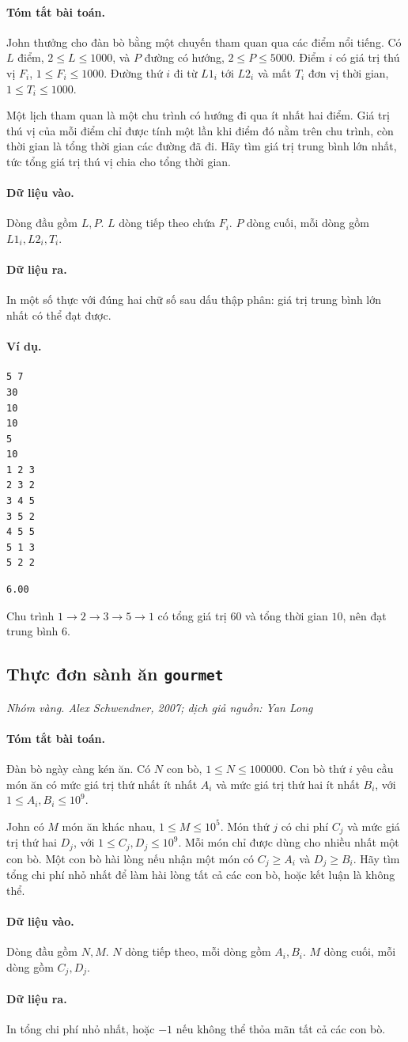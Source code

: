 \documentclass[11pt]{article}
\newcommand{\problem}[4]{%
  \subsection[#1 (#2)]{#1 \hfill {\normalsize\texttt{#2}}}%
  \noindent\textit{#3. #4}\par\smallskip
}
\newcommand{\iosec}[1]{\paragraph{#1}}
\begin{document}
\iosec{Tóm tắt bài toán.}
John thưởng cho đàn bò bằng một chuyến tham quan qua các điểm nổi tiếng. Có
\(L\) điểm, \(2\le L\le 1000\), và \(P\) đường có hướng,
\(2\le P\le 5000\). Điểm \(i\) có giá trị thú vị \(F_i\),
\(1\le F_i\le 1000\). Đường thứ \(i\) đi từ \(L1_i\) tới \(L2_i\) và mất
\(T_i\) đơn vị thời gian, \(1\le T_i\le 1000\).

Một lịch tham quan là một chu trình có hướng đi qua ít nhất hai điểm. Giá trị
thú vị của mỗi điểm chỉ được tính một lần khi điểm đó nằm trên chu trình, còn
thời gian là tổng thời gian các đường đã đi. Hãy tìm giá trị trung bình lớn
nhất, tức tổng giá trị thú vị chia cho tổng thời gian.

\iosec{Dữ liệu vào.}
Dòng đầu gồm \(L,P\). \(L\) dòng tiếp theo chứa \(F_i\). \(P\) dòng cuối,
mỗi dòng gồm \(L1_i,L2_i,T_i\).

\iosec{Dữ liệu ra.}
In một số thực với đúng hai chữ số sau dấu thập phân: giá trị trung bình lớn
nhất có thể đạt được.

\iosec{Ví dụ.}
\begin{verbatim}
5 7
30
10
10
5
10
1 2 3
2 3 2
3 4 5
3 5 2
4 5 5
5 1 3
5 2 2
\end{verbatim}

\begin{verbatim}
6.00
\end{verbatim}

Chu trình \(1\to2\to3\to5\to1\) có tổng giá trị \(60\) và tổng thời gian
\(10\), nên đạt trung bình \(6\).

\problem{Thực đơn sành ăn}{gourmet}{Nhóm vàng}{Alex Schwendner, 2007; dịch giả nguồn: Yan Long}

\iosec{Tóm tắt bài toán.}
Đàn bò ngày càng kén ăn. Có \(N\) con bò, \(1\le N\le 100000\). Con bò thứ
\(i\) yêu cầu món ăn có mức giá trị thứ nhất ít nhất \(A_i\) và mức giá trị
thứ hai ít nhất \(B_i\), với \(1\le A_i,B_i\le 10^9\).

John có \(M\) món ăn khác nhau, \(1\le M\le 10^5\). Món thứ \(j\) có chi phí
\(C_j\) và mức giá trị thứ hai \(D_j\), với \(1\le C_j,D_j\le 10^9\). Mỗi món
chỉ được dùng cho nhiều nhất một con bò. Một con bò hài lòng nếu nhận một món
có \(C_j\ge A_i\) và \(D_j\ge B_i\). Hãy tìm tổng chi phí nhỏ nhất để làm hài
lòng tất cả các con bò, hoặc kết luận là không thể.

\iosec{Dữ liệu vào.}
Dòng đầu gồm \(N,M\). \(N\) dòng tiếp theo, mỗi dòng gồm \(A_i,B_i\). \(M\)
dòng cuối, mỗi dòng gồm \(C_j,D_j\).

\iosec{Dữ liệu ra.}
In tổng chi phí nhỏ nhất, hoặc \(-1\) nếu không thể thỏa mãn tất cả các con
bò.
\end{document}
